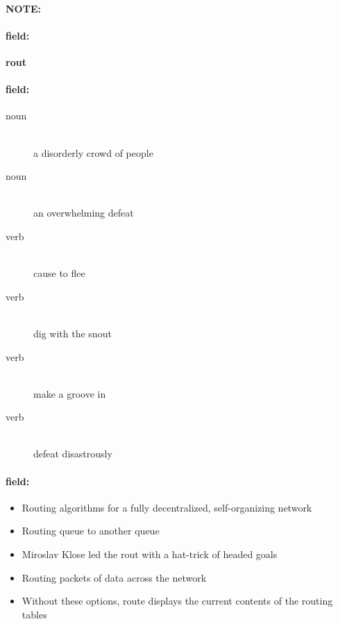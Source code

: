 \documentclass[12pt]{article}
\newenvironment{note}{\paragraph{NOTE:}}{}
\newenvironment{field}{\paragraph{field:}}{}
\begin{document}
\begin{note}
\begin{field}
\textbf{\large rout}
\end{field}


\begin{field}
\begin{description}
\item[noun] \hfill \\ 
a disorderly crowd of people

\item[noun] \hfill \\ 
an overwhelming defeat

\item[verb] \hfill \\ 
cause to flee

\item[verb] \hfill \\ 
dig with the snout

\item[verb] \hfill \\ 
make a groove in

\item[verb] \hfill \\ 
defeat disastrously

\end{description}
\end{field}

\begin{field}
\begin{itemize}
\item Routing algorithms for a fully decentralized, self-organizing network
\item Routing queue to another queue
\item Miroslav Klose led the rout with a hat-trick of headed goals
\item Routing packets of data across the network
\item Without these options, route displays the current contents of the routing tables
\end{itemize}
\end{field}
\end{note}
\end{document}
